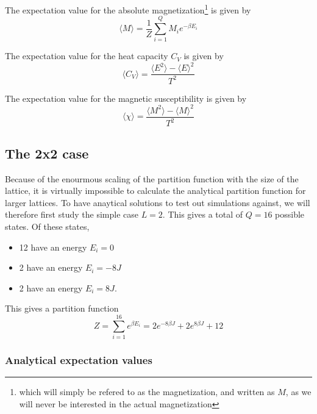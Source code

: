 \documentclass[10pt,a4paper]{article}
\begin{document}

The expectation value for the absolute magnetization\footnote{which will simply be refered to as the magnetization, and written as $M$, as we will never be interested in the actual magnetization} is given by
\begin{equation}
\langle M \rangle = \frac{1}{Z} \sum\limits_{i=1}^Q M_i e^{-\beta E_i}
\end{equation}

The expectation value for the heat capacity $C_V$ is given by
\begin{equation}
\langle C_V \rangle = \frac{\langle E^2 \rangle - \langle E \rangle ^2}{T^2}
\end{equation}

The expectation value for the magnetic susceptibility is given by
\begin{equation}
\langle \chi \rangle = \frac{\langle M^2 \rangle - \langle M \rangle ^2}{T^2}
\end{equation}




\subsection{The 2x2 case}

Because of the enourmous scaling of the partition function with the size of the lattice, it is virtually impossible to calculate the analytical partition function for larger lattices. To have anaytical solutions to test out simulations against, we will therefore first study the simple case $L = 2$. This gives a total of $Q = 16$ possible states. Of these states,
\begin{itemize}
\item 12 have an energy $E_i = 0$
\item 2 have an energy $E_i = -8J$
\item 2 have an energy $E_i = 8J$.
\end{itemize}
This gives a partition function
\begin{equation}
Z = \sum\limits_{i=1}^{16} e^{\beta E_i} = 2e^{-8\beta J} + 2e^{8\beta J} + 12
\end{equation}

\subsubsection{Analytical expectation values}
\end{document}
